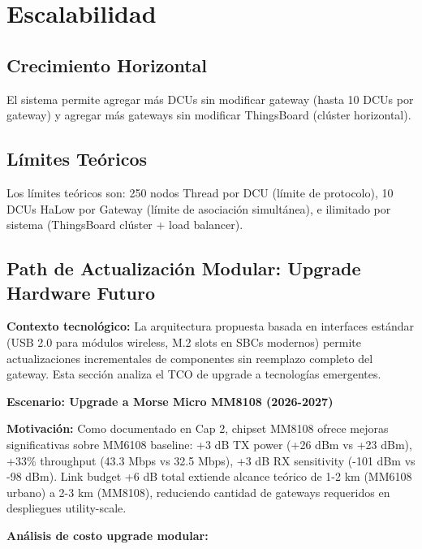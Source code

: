 ﻿\section{Escalabilidad}

\subsection{Crecimiento Horizontal}

El sistema permite agregar más DCUs sin modificar gateway (hasta 10 DCUs por gateway) y agregar más gateways sin modificar ThingsBoard (clúster horizontal).

\subsection{Límites Teóricos}

Los límites teóricos son: 250 nodos Thread por DCU (límite de protocolo), 10 DCUs HaLow por Gateway (límite de asociación simultánea), e ilimitado por sistema (ThingsBoard clúster + load balancer).

\subsection{Path de Actualización Modular: Upgrade Hardware Futuro}

\textbf{Contexto tecnológico:} La arquitectura propuesta basada en interfaces estándar (USB 2.0 para módulos wireless, M.2 slots en SBCs modernos) permite actualizaciones incrementales de componentes sin reemplazo completo del gateway. Esta sección analiza el TCO de upgrade a tecnologías emergentes.

\textbf{Escenario: Upgrade a Morse Micro MM8108 (2026-2027)}

\textbf{Motivación:} Como documentado en Cap 2, chipset MM8108 ofrece mejoras significativas sobre MM6108 baseline: +3 dB TX power (+26 dBm vs +23 dBm), +33\% throughput (43.3 Mbps vs 32.5 Mbps), +3 dB RX sensitivity (-101 dBm vs -98 dBm). Link budget +6 dB total extiende alcance teórico de 1-2 km (MM6108 urbano) a 2-3 km (MM8108), reduciendo cantidad de gateways requeridos en despliegues utility-scale.

\textbf{Análisis de costo upgrade modular:}

